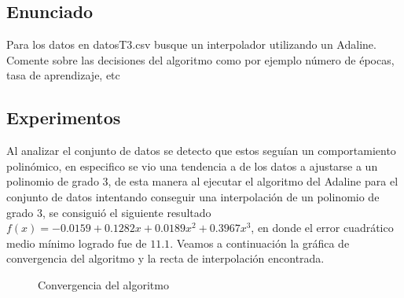 \documentclass{article}
\theoremstyle{mytheoremstyle}
\theoremstyle{mytheoremstyle}
\theoremstyle{myproblemstyle}
\begin{document}
\subsection*{Enunciado}

Para los datos en datosT3.csv busque un interpolador utilizando un Adaline. Comente sobre las decisiones del algoritmo como por ejemplo número de épocas, tasa de aprendizaje, etc

\subsection*{Experimentos}

Al analizar el conjunto de datos se detecto que estos seguían un comportamiento polinómico, en especifico se vio una tendencia a de los datos a ajustarse a un polinomio de grado 3, de esta manera al ejecutar el algoritmo del Adaline para el conjunto de datos intentando conseguir una interpolación de un polinomio de grado 3, se consiguió el siguiente resultado $f(x) = -0.0159+0.1282x+0.0189x^2+0.3967x^3$, en donde el error cuadrático medio mínimo logrado fue de $11.1$. Veamos a continuación la gráfica de convergencia del algoritmo y la recta de interpolación encontrada.

\vspace{0.2cm}

\begin{figure}[!ht]
  \centering
  \caption{Convergencia del algoritmo}
\end{figure}

\newpage
\begin{figure}[!ht]
  \centering
\end{figure}
\end{document}
